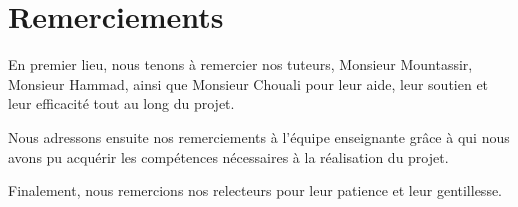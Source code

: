 \chapter*{Remerciements}
\thispagestyle{empty}
\pagestyle{empty}

En premier lieu, nous tenons {\`a} remercier nos tuteurs, Monsieur Mountassir, Monsieur Hammad, ainsi que Monsieur Chouali pour leur aide, leur soutien et leur efficacit{\'e} tout au long du projet.

Nous adressons ensuite nos remerciements {\`a} l'{\'e}quipe enseignante gr{\^a}ce {\`a} qui nous avons pu acqu{\'e}rir les comp{\'e}tences n{\'e}cessaires {\`a} la r{\'e}alisation du projet.

Finalement, nous remercions nos relecteurs pour leur patience et leur gentillesse.


\clearpage
